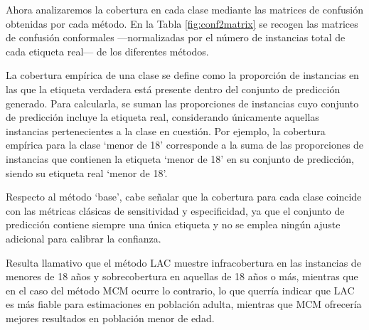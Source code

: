 Ahora analizaremos la cobertura en cada clase mediante las matrices de confusión obtenidas por cada método. 
En la Tabla \ref{fig:conf2matrix} se recogen las matrices de confusión conformales ---normalizadas por el número de instancias total de cada etiqueta real--- de los diferentes métodos. 

La cobertura empírica de una clase se define como la proporción de instancias en las que la etiqueta verdadera está presente dentro del conjunto de predicción generado. Para calcularla, se suman las proporciones de instancias cuyo conjunto de predicción incluye la etiqueta real, considerando únicamente aquellas instancias pertenecientes a la clase en cuestión. Por ejemplo, la cobertura empírica para la clase `menor de 18' corresponde a la suma de las proporciones de instancias que contienen la etiqueta `menor de 18' en su conjunto de predicción, siendo su etiqueta real `menor de 18'.

Respecto al método `base', cabe señalar que la cobertura para cada clase coincide con las métricas clásicas de sensitividad y especificidad, ya que el conjunto de predicción contiene siempre una única etiqueta y no se emplea ningún ajuste adicional para calibrar la confianza.

Resulta llamativo que el método \acrshort{LAC} muestre infracobertura en las instancias de menores de 18 años y sobrecobertura en aquellas de 18 años o más, mientras que en el caso del método MCM ocurre lo contrario, lo que querría indicar que \acrshort{LAC} es más fiable para estimaciones en población adulta, mientras que MCM ofrecería mejores resultados en población menor de edad. 


